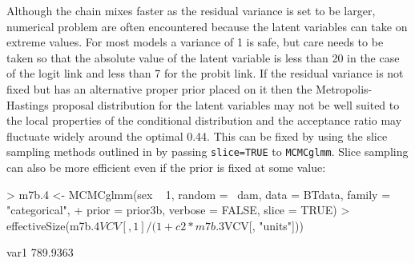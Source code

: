 \documentclass{article}
\begin{document}
Although the chain mixes faster as the residual variance is set to be larger, numerical problem are often encountered because the latent variables can take on extreme values. For most models a variance of 1 is safe, but care needs to be taken so that the absolute value of the latent variable is less than 20 in the case of the logit link and less than 7 for the probit link. If the residual variance is not fixed but has an alternative proper prior placed on it then the Metropolis-Hastings proposal distribution for the latent variables may not be well suited to the local properties of the conditional distribution and the acceptance ratio may fluctuate widely around the optimal 0.44. This can be fixed by using the slice sampling methods outlined in \citet{Damien.1999} by passing \texttt{slice=TRUE} to \texttt{MCMCglmm}. Slice sampling can also be more efficient even if the prior is fixed at some value: 
 
\begin{Schunk}
\begin{Sinput}
> m7b.4 <- MCMCglmm(sex ~ 1, random = ~dam, data = BTdata, family = "categorical", 
+     prior = prior3b, verbose = FALSE, slice = TRUE)
> effectiveSize(m7b.4$VCV[, 1]/(1 + c2 * m7b.3$VCV[, "units"]))
\end{Sinput}
\begin{Soutput}
    var1 
789.9363 
\end{Soutput}
\end{Schunk}

\ifalone
\end{document}
